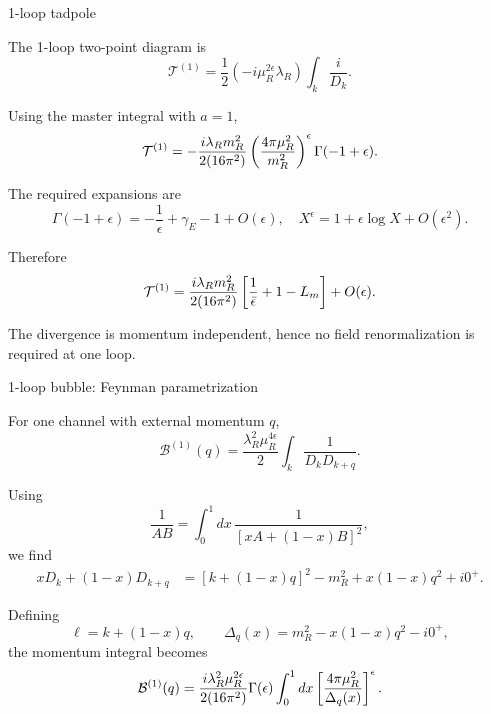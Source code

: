 \documentclass[aspectratio=169,10pt]{beamer}
\begin{document}
\begin{frame}{1-loop tadpole}

The 1-loop two-point diagram is
\begin{equation}
\mathcal T^{(1)}
=
\frac12
(-i\mu_R^{2\epsilon}\lambda_R)
\int_k\frac{i}{D_k}.
\end{equation}

Using the master integral with $a=1$,
\begin{equation}
\mathcal T^{(1)}
=
-\frac{i\lambda_Rm_R^2}{2(16\pi^2)}
\left(
\frac{4\pi\mu_R^2}{m_R^2}
\right)^\epsilon
\Gamma(-1+\epsilon).
\end{equation}

The required expansions are
\begin{equation}
\Gamma(-1+\epsilon)
=
-\frac1\epsilon+\gamma_E-1+O(\epsilon),\quad X^\epsilon
=
1+\epsilon\log X+O(\epsilon^2).
\end{equation}

Therefore
\begin{equation}
\mathcal T^{(1)}
=
\frac{i\lambda_Rm_R^2}{2(16\pi^2)}
\left[
\frac1{\bar\epsilon}
+
1-L_m
\right]
+
O(\epsilon).
\end{equation}

The divergence is momentum independent, hence no field
renormalization is required at one loop.


\end{frame}


\begin{frame}{1-loop bubble: Feynman parametrization}

For one channel with external momentum $q$,
\begin{equation}
\mathcal B^{(1)}(q)
=
\frac{\lambda_R^2\mu_R^{4\epsilon}}2
\int_k
\frac1{D_kD_{k+q}}.
\end{equation}

Using
\begin{equation}
\frac1{AB}
=
\int_0^1 dx\,
\frac1{[xA+(1-x)B]^2},
\end{equation}
we find
\begin{align}
xD_k+(1-x)D_{k+q}
&=
[k+(1-x)q]^2 
-m_R^2+x(1-x)q^2+i0^+.
\end{align}

Defining
\begin{equation}
\ell=k+(1-x)q,
\qquad
\Delta_q(x)
=
m_R^2-x(1-x)q^2-i0^+,
\end{equation}
the momentum integral becomes
\begin{equation}
\mathcal B^{(1)}(q)
=
\frac{i\lambda_R^2\mu_R^{2\epsilon}}
{2(16\pi^2)}
\Gamma(\epsilon)
\int_0^1dx
\left[
\frac{4\pi\mu_R^2}
{\Delta_q(x)}
\right]^\epsilon .
\end{equation}


\end{frame}
\end{document}
